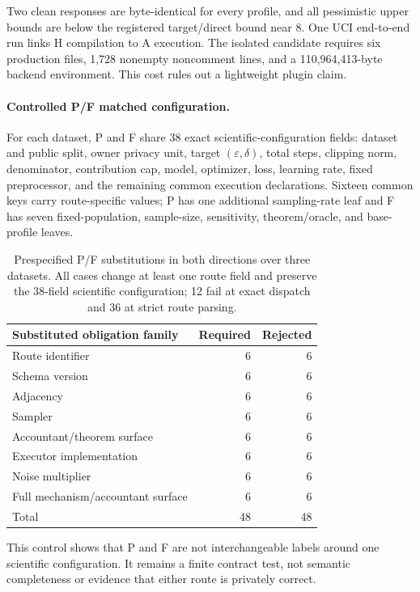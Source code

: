 \documentclass[letterpaper]{article}
\begin{document}
Two clean responses are byte-identical for every profile, and all pessimistic
upper bounds are below the registered target/direct bound near 8.  One UCI
end-to-end run links H compilation to A execution.  The isolated candidate
requires six production files, 1,728 nonempty noncomment lines, and a
110,964,413-byte backend environment.  This cost rules out a lightweight
plugin claim.

\paragraph{Controlled P/F matched configuration.}
For each dataset, P and F share 38 exact scientific-configuration fields:
dataset and
public split, owner privacy unit, target $(\varepsilon,\delta)$, total steps,
clipping norm, denominator, contribution cap, model, optimizer, loss, learning
rate, fixed preprocessor, and the remaining common execution declarations.
Sixteen common keys carry route-specific values; P has one additional
sampling-rate leaf and F has seven fixed-population, sample-size, sensitivity,
theorem/oracle, and base-profile leaves.

\begin{table}[t]
\centering
\footnotesize
\setlength{\tabcolsep}{5pt}
\begin{tabular}{@{}lrr@{}}
\toprule
Substituted obligation family & Required & Rejected \\
\midrule
Route identifier & 6 & 6 \\
Schema version & 6 & 6 \\
Adjacency & 6 & 6 \\
Sampler & 6 & 6 \\
Accountant/theorem surface & 6 & 6 \\
Executor implementation & 6 & 6 \\
Noise multiplier & 6 & 6 \\
Full mechanism/accountant surface & 6 & 6 \\
\midrule
Total & 48 & 48 \\
\bottomrule
\end{tabular}
\caption{Prespecified P/F substitutions in both directions over three
datasets.  All cases change at least one route field and preserve the 38-field
scientific configuration; 12 fail at exact dispatch and 36 at strict route
parsing.}
\label{tab:supp-matched-shell}
\end{table}

This control shows that P and F are not interchangeable labels around one
scientific configuration.  It remains a finite contract test, not semantic
completeness or evidence that either route is privately correct.
\end{document}
